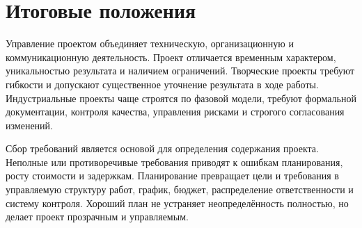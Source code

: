 \documentclass[12pt,a4paper]{article}
\begin{document}
\section{Итоговые положения}

Управление проектом объединяет техническую, организационную и коммуникационную деятельность. Проект отличается временным характером, уникальностью результата и наличием ограничений. Творческие проекты требуют гибкости и допускают существенное уточнение результата в ходе работы. Индустриальные проекты чаще строятся по фазовой модели, требуют формальной документации, контроля качества, управления рисками и строгого согласования изменений.

Сбор требований является основой для определения содержания проекта. Неполные или противоречивые требования приводят к ошибкам планирования, росту стоимости и задержкам. Планирование превращает цели и требования в управляемую структуру работ, график, бюджет, распределение ответственности и систему контроля. Хороший план не устраняет неопределённость полностью, но делает проект прозрачным и управляемым.
\end{document}
